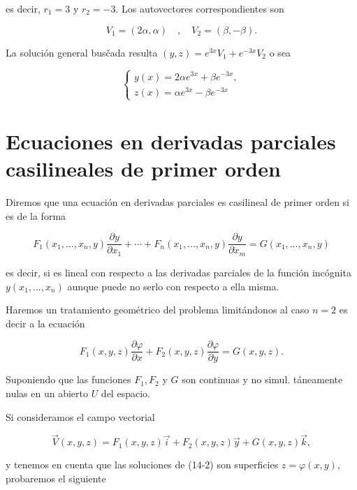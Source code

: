 \documentclass[10pt]{article}
\theoremstyle{plain}
\theoremstyle{definition}
\theoremstyle{remark}
\begin{document}
es decir, $r_{1}=3$ y $r_{2}=-3$. Los autovectores correspondientes son

$$
V_{1}=(2 \alpha, \alpha) \quad, \quad V_{2}=(\beta,-\beta) .
$$

La solución general busčada resulta $(y, z)=e^{3 x} V_{1}+e^{-3 x} V_{2}$ o sea

$$
\left\{\begin{array}{l}
y(x)=2 \alpha e^{3 x}+\beta e^{-3 x}, \\
z(x)=\alpha e^{3 x}-\beta e^{-3 x}
\end{array}\right.
$$

\section{Ecuaciones en derivadas parciales casilineales de primer orden}
Diremos que una ecuación en derivadas parciales es casilineal de primer orden si es de la forma


\begin{equation*}
F_{1}\left(x_{1}, \ldots, x_{n}, y\right) \frac{\partial y}{\partial x_{1}}+\cdots+F_{n}\left(x_{1}, \ldots, x_{n}, y\right) \frac{\partial y}{\partial \dot{x}_{m}}=G\left(x_{1}, \ldots, x_{n}, y\right) \tag{14-1}
\end{equation*}


es decir, si es lineal con respecto a las derivadas parciales de la función incógnita $y\left(x_{1}, \ldots, x_{n}\right)$ aunque puede no serlo con respecto a ella misma.

Haremos un tratamiento geométrico del problema limitándonos al caso $n=2$ es decir a la ecuación



\begin{equation*}
F_{1}(x, y, z) \frac{\partial \varphi}{\partial x}+F_{2}(x, y, z) \frac{\partial \varphi}{\partial y}=G(x, y, z) . \tag{14-2}
\end{equation*}


Suponiendo que las funciones $F_{1}, F_{2}$ y $G$ son continuas y no simul. táneamente nulas en un abierto $U$ del espacio.

Si consideramos el campo vectorial

$$
\vec{V}(x, y, z)=F_{1}(x, y, z) \vec{i}+F_{2}(x, y, z) \vec{y}+G(x, y, z) \vec{k},
$$

y tenemos en cuenta que las soluciones de (14-2) son superficies $z=\varphi(x, y)$, probaremos el siguiente
\end{document}
